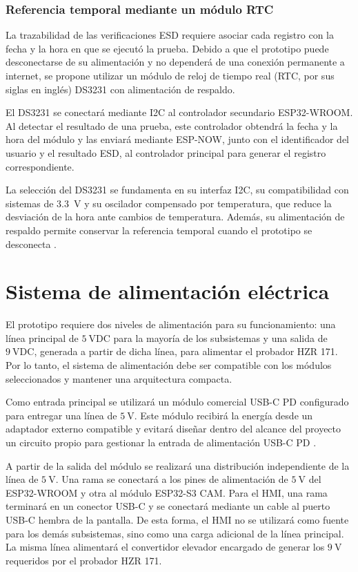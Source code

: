 \subsubsection{Referencia temporal mediante un módulo RTC}

La trazabilidad de las verificaciones ESD requiere asociar cada registro con la
fecha y la hora en que se ejecutó la prueba. Debido a que el prototipo puede
desconectarse de su alimentación y no dependerá de una conexión
permanente a internet, se propone utilizar un módulo de reloj de tiempo real
(RTC, por sus siglas en inglés) DS3231 con alimentación de respaldo.

El DS3231 se conectará mediante I2C al controlador secundario ESP32-WROOM. Al
detectar el resultado de una prueba, este controlador obtendrá la fecha y la
hora del módulo y las enviará mediante ESP-NOW, junto con el identificador del
usuario y el resultado ESD, al controlador principal para generar el registro
correspondiente.

La selección del DS3231 se fundamenta en su interfaz I2C, su compatibilidad con
sistemas de $3.3$~V y su oscilador compensado por temperatura, que reduce la
desviación de la hora ante cambios de temperatura. Además, su alimentación de
respaldo permite conservar la referencia temporal cuando el prototipo se
desconecta \cite{AnalogDevices_DS3231}.

\section{Sistema de alimentación eléctrica}

El prototipo requiere dos niveles de alimentación para su funcionamiento: una
línea principal de $5~\mathrm{VDC}$ para la mayoría de los subsistemas y una
salida de $9~\mathrm{VDC}$, generada a partir de dicha línea, para alimentar el
probador HZR 171. Por lo tanto, el sistema de alimentación debe ser compatible
con los módulos seleccionados y mantener una arquitectura compacta.

Como entrada principal se utilizará un módulo comercial USB-C PD configurado
para entregar una línea de $5~\mathrm{V}$. Este módulo recibirá la energía desde
un adaptador externo compatible y evitará diseñar dentro del alcance del
proyecto un circuito propio para gestionar la entrada de alimentación USB-C PD
\cite{usbif_usb_power_delivery}.

A partir de la salida del módulo se realizará una distribución independiente
de la línea de $5~\mathrm{V}$. Una rama se conectará a los pines de alimentación
de $5~\mathrm{V}$ del ESP32-WROOM y otra al módulo ESP32-S3 CAM. Para el HMI, una
rama terminará en un conector USB-C y se conectará mediante un cable al puerto
USB-C hembra de la pantalla. De esta forma, el HMI no se utilizará como fuente
para los demás subsistemas, sino como una carga adicional de la línea principal.
La misma línea alimentará el convertidor elevador encargado de generar los
$9~\mathrm{V}$ requeridos por el probador HZR 171.

